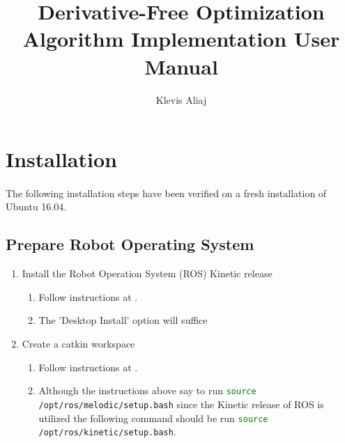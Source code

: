 \documentclass[letterpaper]{article}
\title{\textbf{Derivative-Free Optimization Algorithm Implementation User Manual}}
\author{Klevis Aliaj}
\date{} %
\begin{document}
\maketitle

\section{Installation} \label{sec:installation}
\paragraph{}
The following installation steps have been verified on a fresh installation of Ubuntu 16.04.

\subsection{Prepare Robot Operating System}
\begin{enumerate}
	\item Install the Robot Operation System (ROS) Kinetic release
		\begin{enumerate}
			\item Follow instructions at \href{http://wiki.ros.org/kinetic/Installation/Ubuntu}{}.
			\item The 'Desktop Install' option will suffice
		\end{enumerate}
	\item Create a catkin workspace
		\begin{enumerate}
			\item Follow instructions at \href{http://wiki.ros.org/catkin/Tutorials/create_a_workspace}{}.
			\item Although the instructions above say to run \lstinline[language=bash]!source /opt/ros/melodic/setup.bash! since the Kinetic release of ROS is utilized the following command should be run \lstinline[language=bash]!source /opt/ros/kinetic/setup.bash!.
		\end{enumerate}
\end{enumerate}
\end{document}
